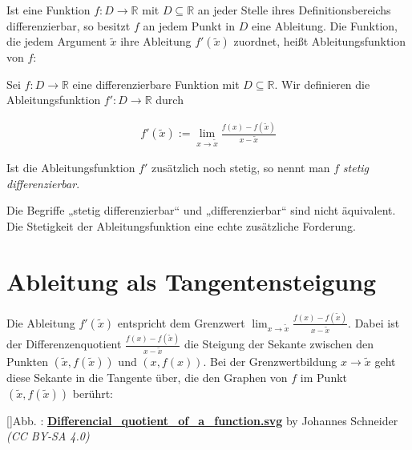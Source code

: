 \documentclass[fontsize=9pt,
               parskip=half-,
               DIV=14,
               listof=chapterentry,
               tocflat]{scrbook}
\newcounter{imagelabel}
\begin{document}
Ist eine Funktion $f:D\to \mathbb {R} $ mit $D\subseteq \mathbb {R} $ an jeder Stelle ihres Definitionsbereichs differenzierbar, so besitzt $f$ an jedem Punkt in $D$ eine Ableitung. Die Funktion, die jedem Argument ${\tilde {x}}$ ihre Ableitung $f'({\tilde {x}})$ zuordnet, heißt Ableitungsfunktion von $f$:

\begin{definition*}[Ableitungsfunktion]
Sei $f:D\to \mathbb {R} $ eine differenzierbare Funktion mit $D\subseteq \mathbb {R} $. Wir definieren die Ableitungsfunktion $f':D\to \mathbb {R} $ durch

\begin{align*}
f'({\tilde {x}}):=\lim _{x\to {\tilde {x}}}{\frac {f(x)-f({\tilde {x}})}{x-{\tilde {x}}}}
\end{align*}

Ist die Ableitungsfunktion $f'$ zusätzlich noch stetig, so nennt man $f$ \emph{stetig differenzierbar}.

\end{definition*}

\begin{warning*}
Die Begriffe „stetig differenzierbar“ und „differenzierbar“ sind nicht äquivalent. Die Stetigkeit der Ableitungsfunktion eine echte zusätzliche Forderung.

\end{warning*}

\section{Ableitung als Tangentensteigung}

Die Ableitung $f'({\tilde {x}})$ entspricht dem Grenzwert $\lim _{x\to {\tilde {x}}}{\tfrac {f(x)-f({\tilde {x}})}{x-{\tilde {x}}}}$. Dabei ist der Differenzenquotient ${\tfrac {f(x)-f({\tilde {x}})}{x-{\tilde {x}}}}$ die Steigung der Sekante zwischen den Punkten $({\tilde {x}},f({\tilde {x}}))$ und $(x,f(x))$. Bei der Grenzwertbildung $x\to {\tilde {x}}$ geht diese Sekante in die Tangente über, die den Graphen von $f$ im Punkt $({\tilde {x}},f({\tilde {x}}))$ berührt:

[]{Abb. : \protect\href{https://commons.wikimedia.org/wiki/File:Differencial_quotient_of_a_function.svg}{\textbf{Differencial\allowbreak\_quotient\allowbreak\_of\allowbreak\_a\allowbreak\_function.svg}} by Johannes Schneider \textit{(CC BY-SA 4.0)}}\begin{center}
\end{center}
\end{document}
